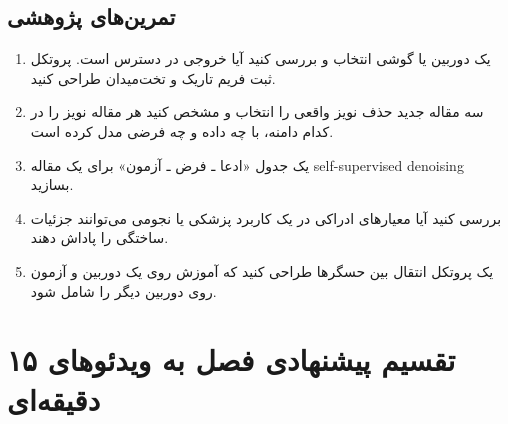 \documentclass[12pt,openany,oneside]{book}
\begin{document}
\subsection*{تمرین‌های پژوهشی}
\begin{enumerate}
\item یک دوربین یا گوشی انتخاب و بررسی کنید آیا خروجی  در دسترس است. پروتکل ثبت فریم تاریک و تخت‌میدان طراحی کنید.
\item سه مقاله جدید حذف نویز واقعی را انتخاب و مشخص کنید هر مقاله نویز را در کدام دامنه، با چه داده و چه فرضی مدل کرده است.
\item یک جدول «ادعا ـ فرض ـ آزمون» برای یک مقاله self-supervised denoising بسازید.
\item بررسی کنید آیا معیارهای ادراکی در یک کاربرد پزشکی یا نجومی می‌توانند جزئیات ساختگی را پاداش دهند.
\item یک پروتکل انتقال بین حسگرها طراحی کنید که آموزش روی یک دوربین و آزمون روی دوربین دیگر را شامل شود.
\end{enumerate}

\section{تقسیم پیشنهادی فصل به ویدئوهای ۱۵ دقیقه‌ای}
\end{document}

